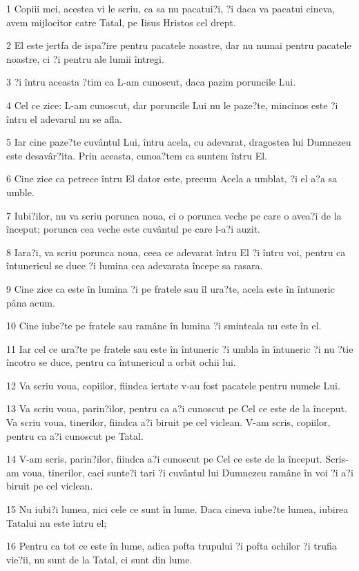 \par 1 Copiii mei, acestea vi le scriu, ca sa nu pacatui?i, ?i daca va pacatui cineva, avem mijlocitor catre Tatal, pe Iisus Hristos cel drept.
\par 2 El este jertfa de ispa?ire pentru pacatele noastre, dar nu numai pentru pacatele noastre, ci ?i pentru ale lumii întregi.
\par 3 ?i întru aceasta ?tim ca L-am cunoscut, daca pazim poruncile Lui.
\par 4 Cel ce zice: L-am cunoscut, dar poruncile Lui nu le paze?te, mincinos este ?i întru el adevarul nu se afla.
\par 5 Iar cine paze?te cuvântul Lui, întru acela, cu adevarat, dragostea lui Dumnezeu este desavâr?ita. Prin aceasta, cunoa?tem ca suntem întru El.
\par 6 Cine zice ca petrece întru El dator este, precum Acela a umblat, ?i el a?a sa umble.
\par 7 Iubi?ilor, nu va scriu porunca noua, ci o porunca veche pe care o avea?i de la început; porunca cea veche este cuvântul pe care l-a?i auzit.
\par 8 Iara?i, va scriu porunca noua, ceea ce adevarat întru El ?i întru voi, pentru ca întunericul se duce ?i lumina cea adevarata începe sa rasara.
\par 9 Cine zice ca este în lumina ?i pe fratele sau îl ura?te, acela este în întuneric pâna acum.
\par 10 Cine iube?te pe fratele sau ramâne în lumina ?i sminteala nu este în el.
\par 11 Iar cel ce ura?te pe fratele sau este în întuneric ?i umbla în întuneric ?i nu ?tie încotro se duce, pentru ca întunericul a orbit ochii lui.
\par 12 Va scriu voua, copiilor, fiindca iertate v-au fost pacatele pentru numele Lui.
\par 13 Va scriu voua, parin?ilor, pentru ca a?i cunoscut pe Cel ce este de la început. Va scriu voua, tinerilor, fiindca a?i biruit pe cel viclean. V-am scris, copiilor, pentru ca a?i cunoscut pe Tatal.
\par 14 V-am scris, parin?ilor, fiindca a?i cunoscut pe Cel ce este de la început. Scris-am voua, tinerilor, caci sunte?i tari ?i cuvântul lui Dumnezeu ramâne în voi ?i a?i biruit pe cel viclean.
\par 15 Nu iubi?i lumea, nici cele ce sunt în lume. Daca cineva iube?te lumea, iubirea Tatalui nu este întru el;
\par 16 Pentru ca tot ce este în lume, adica pofta trupului ?i pofta ochilor ?i trufia vie?ii, nu sunt de la Tatal, ci sunt din lume.

